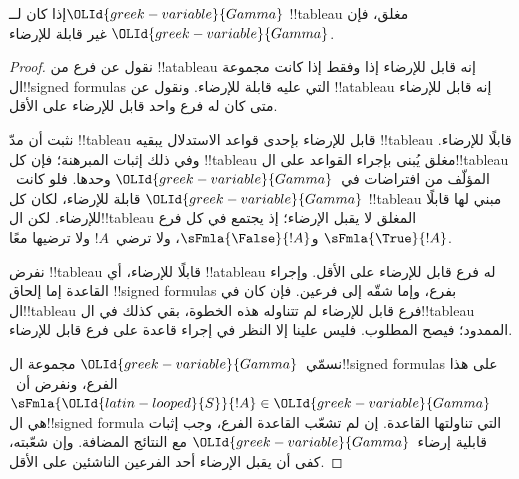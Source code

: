 \documentclass[../../../include/open-logic-section]{subfiles}
\begin{document}
\begin{thm}[السلامة]
  إذا كان لــ${\OLId{greek-variable}{Gamma}}$ !!{tableau} مغلق، فإن ${\OLId{greek-variable}{Gamma}}$ غير قابلة للإرضاء.
\end{thm}

\begin{proof}
نقول عن فرع من !!a{tableau} إنه قابل للإرضاء إذا وفقط إذا كانت
مجموعة ال!!{signed formula}s التي عليه قابلة للإرضاء.
ونقول عن !!a{tableau} إنه قابل للإرضاء متى كان له فرع واحد
قابل للإرضاء على الأقل.

نثبت أن مدّ !!{tableau} قابل للإرضاء بإحدى قواعد الاستدلال
يبقيه !!{tableau} قابلًا للإرضاء. وفي ذلك إثبات المبرهنة؛
فإن كل !!{tableau} مغلق يُبنى بإجراء القواعد على ال!!{tableau}
المؤلّف من افتراضات في~${\OLId{greek-variable}{Gamma}}$ وحدها. فلو كانت~${\OLId{greek-variable}{Gamma}}$ قابلة
للإرضاء، لكان كل !!{tableau} مبني لها قابلًا للإرضاء.
لكن ال!!{tableau} المغلق لا يقبل الإرضاء؛ إذ يجتمع في كل فرع
$\sFmla{\True}{!A}$ و$\sFmla{\False}{!A}$، ولا
 ترضي~$!A$ ولا ترضيها معًا.

نفرض !!{tableau} قابلًا للإرضاء، أي !!a{tableau} له فرع قابل
للإرضاء على الأقل. وإجراء القاعدة إما إلحاق !!{signed formula}s
بفرع، وإما شقّه إلى فرعين. فإن كان في ال!!{tableau} فرع قابل
للإرضاء لم تتناوله هذه الخطوة، بقي كذلك في ال!!{tableau} الممدود؛
فيصح المطلوب. فليس علينا إلا النظر في إجراء قاعدة على فرع قابل
للإرضاء.

نسمّي~${\OLId{greek-variable}{Gamma}}$ مجموعة ال!!{signed formula}s على هذا الفرع،
ونفرض أن~$\sFmla{{\OLId{latin-looped}{S}}}{!A} \in {\OLId{greek-variable}{Gamma}}$ هي ال!!{signed formula}
التي تناولتها القاعدة. إن لم تشعّب القاعدة الفرع، وجب إثبات
قابلية إرضاء~${\OLId{greek-variable}{Gamma}}$ مع النتائج المضافة. وإن شعّبته،
كفى أن يقبل الإرضاء أحد الفرعين الناشئين على الأقل.


\end{proof}
\end{document}
